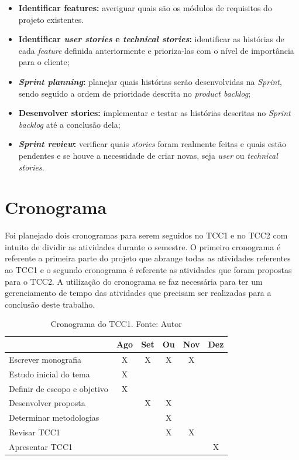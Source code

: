 \begin{itemize}
    \item \textbf{Identificar features:} averiguar quais são os módulos de requisitos do projeto existentes.
    
    \item \textbf{Identificar \textit{user stories} e \textit{technical stories}:} identificar as histórias de cada \textit{feature} definida anteriormente e prioriza-las com o nível de importância para o cliente;
    
    \item \textbf{\textit{Sprint planning}:} planejar quais histórias serão desenvolvidas na \textit{Sprint}, sendo seguido a ordem de prioridade descrita no \textit{product backlog};
    
    \item \textbf{Desenvolver stories:} implementar e testar as histórias descritas no \textit{Sprint backlog} até a conclusão dela;
    
    \item \textbf{\textit{Sprint review}:} verificar quais \textit{stories} foram realmente feitas e quais estão pendentes e se houve a necessidade de criar novas, seja \textit{user} ou \textit{technical stories}.
\end{itemize}

\section{Cronograma}

Foi planejado dois cronogramas para serem seguidos no TCC1 e no TCC2 com intuito de dividir as atividades durante o semestre. O primeiro cronograma é referente a primeira parte do projeto que abrange todas as atividades referentes ao TCC1 e o segundo cronograma é referente as atividades que foram propostas para o TCC2. A utilização do cronograma se faz necessária para ter um gerenciamento de tempo das atividades que precisam ser realizadas para a conclusão deste trabalho.

\begin{table}[H]
\centering
\begin{tabular}{lccccc}
\hline
\textbf{} & \textbf{Ago} & \textbf{Set} & \textbf{Ou} & \textbf{Nov} & \textbf{Dez} \\ \hline
Escrever monografia & X & X & X & X &  \\ \hline
Estudo inicial do tema & X &  &  &  &  \\ \hline
Definir de escopo e objetivo & X &  &  &  &  \\ \hline
Desenvolver proposta &  & X & X &  &  \\ \hline
Determinar metodologias &  &  & X &  &  \\ \hline
Revisar TCC1 &  &  & X & X &  \\ \hline
Apresentar TCC1 &  &  &  &  & X \\ \hline
\end{tabular}
\caption[Cronograma do TCC1]{Cronograma do TCC1. Fonte: Autor}
\end{table}

